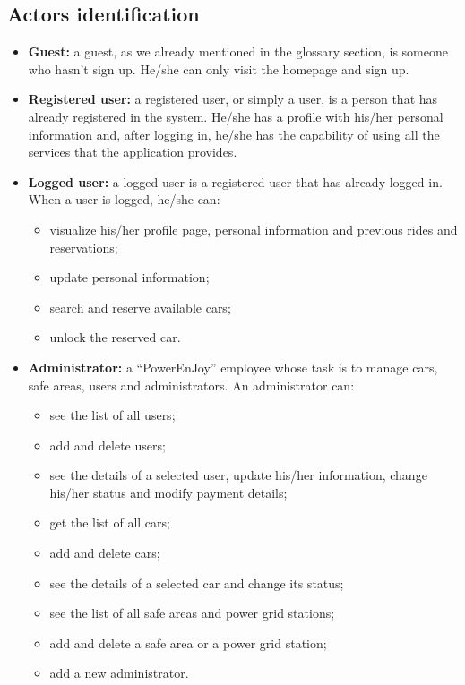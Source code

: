 \pagebreak
\subsection{Actors identification}

\newcommand{\actor}[2]{
	\item \textbf{#1:} #2}

\begin{itemize}
	\actor {Guest}{a guest, as we already mentioned in the glossary section, is someone who hasn't sign up. He/she can only visit the homepage and sign up.}
	
	\actor{Registered user}{a registered user, or simply a user, is a person that has already registered in the system. He/she has a profile with his/her personal information and, after logging in, he/she has the capability of using all the services that the application provides.}
	
	\actor{Logged user}{a logged user is a registered user that has already logged in. When a user is logged, he/she can:
		\begin{itemize}
			\item visualize his/her profile page, personal information and previous rides and reservations;
			\item update personal information;
			\item search and reserve available cars;
			\item unlock the reserved car.
		\end{itemize}
	}

	\actor{Administrator}{a ``PowerEnJoy'' employee whose task is to manage cars, safe areas, users and administrators. An administrator can:
		\begin{itemize}
			\item see the list of all users;
			\item add and delete users;
			\item see the details of a selected user, update his/her information, change his/her status and modify payment details;
			\item get the list of all cars;
			\item add and delete cars;
			\item see the details of a selected car and change its status;
			\item see the list of all safe areas and power grid stations;
			\item add and delete a safe area or a power grid station;
			\item add a new administrator.
		\end{itemize}}
	
\end{itemize}